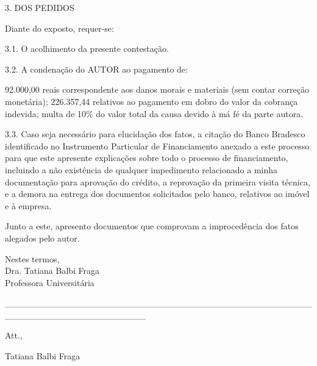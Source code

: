 \documentclass[11pt]{letter}
\begin{document}
3. DOS PEDIDOS

Diante do exposto, requer-se:

3.1. O acolhimento da presente contestação.

3.2. A condenação do AUTOR ao pagamento de:

	92.000,00 reais correspondente aos danos morais e materiais (sem contar correção monetária);
	226.357,44 relativos ao pagamento em dobro do valor da cobrança indevida;
	multa de 10\% do valor total da causa devido à má fé da parte autora.
	
3.3. Caso seja necessário para elucidação dos fatos, a citação do Banco Bradesco identificado no Instrumento Particular de Financiamento anexado a este processo para que este apresente explicações sobre todo o processo de financiamento, incluindo a não existência de qualquer impedimento relacionado a minha documentação para aprovação do crédito, a reprovação da primeira visita técnica, e a demora na entrega dos documentos solicitados pelo banco, relativos ao imóvel e à empresa. 

	
Junto a este, apresento documentos que comprovam a improcedência dos fatos alegados pelo autor.

Nestes termos, \\
Dra. Tatiana Balbi Fraga \\
Professora Universitária

\begin{center}
             \_\_\_\_\_\_\_\_\_\_\_\_\_\_\_\_\_\_\_\_\_\_\_\_\_\_\_\_\_\_\_\_\_\_\_\_\_\_\_\_\_\_\_\_\_\_\_\_\_\_\_\_\_\_\_\_\_\_\_\_\_\_\_\_\_\_\_\_\_\_
    
\end{center}  
          
Att.,

Tatiana Balbi Fraga







\end{document}
